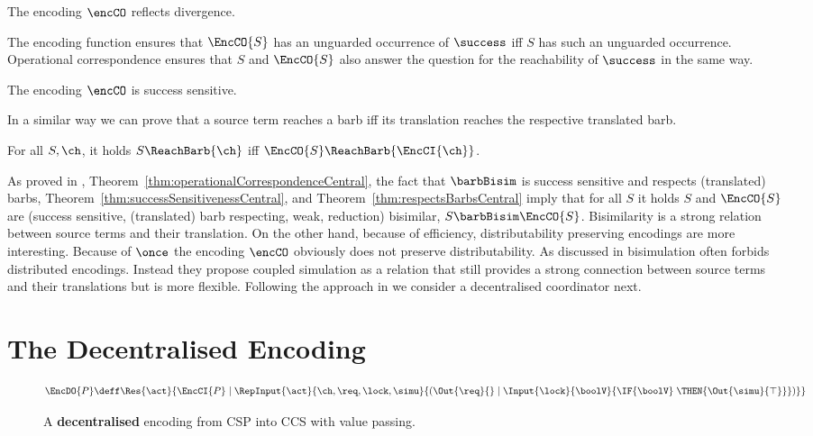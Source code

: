 \documentclass[copyright,creativecommons]{eptcs}
\begin{document}
\begin{theorem}
	The encoding $ \encCO $ reflects divergence.
	\label{thm:divergenceReflectionCentral}
\end{theorem}

The encoding function ensures that $ \EncCO{S} $ has an unguarded occurrence of $ \success $ iff $ S $ has such an unguarded occurrence. Operational correspondence ensures that $ S $ and $ \EncCO{S} $ also answer the question for the reachability of $ \success $ in the same way.

\begin{theorem}
	The encoding $ \encCO $ is success sensitive.
	\label{thm:successSensitivenessCentral}
\end{theorem}

In a similar way we can prove that a source term reaches a barb iff its translation reaches the respective translated barb.

\begin{theorem}
	For all $ S, \ch $, it holds $ S\ReachBarb{\ch} $ iff $ \EncCO{S}\ReachBarb{\EncCI{\ch}} $.
	\label{thm:respectsBarbsCentral}
\end{theorem}

As proved in \cite{petersGlabbeek15}, Theorem~\ref{thm:operationalCorrespondenceCentral}, the fact that $ \barbBisim $ is success sensitive and respects (translated) barbs, Theorem~\ref{thm:successSensitivenessCentral}, and Theorem~\ref{thm:respectsBarbsCentral} imply that for all $ S $ it holds $ S $ and $ \EncCO{S} $ are (success sensitive, (translated) barb respecting, weak, reduction) bisimilar, \ie $ S \barbBisim \EncCO{S} $.
Bisimilarity is a strong relation between source terms and their translation. On the other hand, because of efficiency, distributability preserving encodings are more interesting.
Because of $ \once $ the encoding $ \encCO $ obviously does not preserve distributability. As discussed in \cite{parrowCoupled92} bisimulation often forbids distributed encodings. Instead they propose coupled simulation as a relation that still provides a strong connection between source terms and their translations but is more flexible. Following the approach in \cite{parrowCoupled92} we consider a decentralised coordinator next.

\section{The Decentralised Encoding}
\label{sec:decentral}

\begin{figure}
	\begin{align*}
		\EncDO{P} \deff & \Res{\act}{\EncCI{P} \mid \RepInput{\act}{\ch, \req, \lock, \simu}{\left( \Out{\req}{} \mid \Input{\lock}{\boolV}{\IF{\boolV}\;\THEN{\Out{\simu}{\top}}} \right)}}
	\end{align*}
	\caption{A \textbf{decentralised} encoding from CSP into CCS with value passing.}
	\label{fig:decentralised}
\end{figure}
\end{document}
